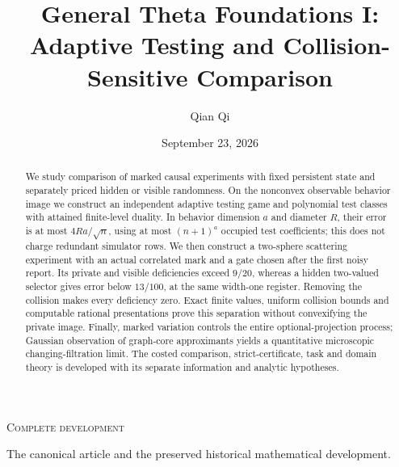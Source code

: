 
\newcommand{\Wone}{W_1}
\newcommand{\Del}{\Delta}
\newcommand{\emptyw}{\varnothing}
\newcommand{\osc}{\operatorname{osc}}
\newcommand{\diam}{\operatorname{diam}}
\newcommand{\Lipone}{\operatorname{Lip}_1}
\newcommand{\aff}{\operatorname{aff}}
\newcommand{\conv}{\operatorname{conv}}
\newcommand{\rplus}{\operatorname{rank}_{+}}
\newcommand{\dpr}{\delta^{\rm p}}
\newcommand{\dhi}{\delta^{\rm h}}
\newcommand{\dvi}{\delta^{\rm v}}
\newcommand{\dmix}{\delta^{\rm mix}}
\newcommand{\cK}{\mathcal K}
\newcommand{\cB}{\mathcal B}
\newcommand{\cI}{\mathcal I}
\title[General Theta Foundations I]{General Theta Foundations I:\\Adaptive Testing and Collision-Sensitive Comparison}
\author{Qian Qi}
\date{September 23, 2026}

\begin{abstract}
We study comparison of marked causal experiments with fixed persistent
state and separately priced hidden or visible randomness. On the
nonconvex observable behavior image we construct an independent
adaptive testing game and polynomial test classes with attained
finite-level duality. In behavior dimension $a$ and diameter $R$, their
error is at most $4Ra/\sqrt n$, using at most $(n+1)^a$ occupied test
coefficients; this does not charge redundant simulator rows. We then
construct a two-sphere scattering experiment with an actual correlated
mark and a gate chosen after the first noisy report. Its private and
visible deficiencies exceed $9/20$, whereas a hidden two-valued
selector gives error below $13/100$, at the same width-one register.
Removing the collision makes every deficiency zero. Exact finite
values, uniform collision bounds and computable rational presentations
prove this separation without convexifying the private image. Finally,
marked variation controls the entire optional-projection process;
Gaussian observation of graph-core approximants yields a quantitative
microscopic changing-filtration limit. The costed comparison,
strict-certificate, task and domain theory is developed with its
separate information and analytic hypotheses.
\end{abstract}
\maketitle
\ifcomplete
\begin{center}\small\textsc{Complete development}\par
The canonical article and the preserved historical mathematical development.
\end{center}
\fi
\tableofcontents
